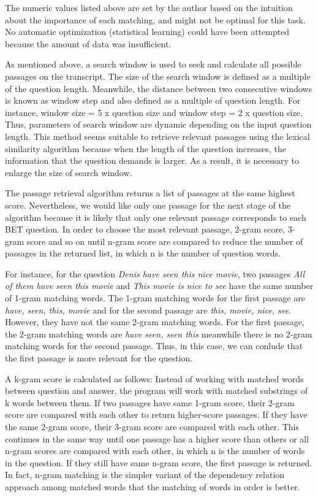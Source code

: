 The numeric values listed above are set by the author based on the intuition about the importance of each matching, and might not be optimal for this task. No automatic optimization (statistical learning) could have been attempted because the amount of data was insufficient.


As mentioned above, a search window is used to seek and calculate all possible passages on the transcript. The size of the search window is defined as a multiple of the question length. Meanwhile, the distance between two consecutive windows is known as window step and also defined as a multiple of question length. For instance, window size = 5 x question size and window step = 2 x question size. Thus, parameters of search window are dynamic depending on the input question length. This method seems suitable to retrieve relevant passages using the lexical similarity algorithm because when the length of the question increases, the information that the question demands is larger. As a result, it is necessary to enlarge the size of search window.

The passage retrieval algorithm returns a list of passages at the same highest score. Nevertheless, we would like only one passage for the next stage of the algorithm because it is likely that only one relevant passage corresponds to each BET question. In order to choose the most relevant passage, 2-gram score, 3-gram score and so on until n-gram score are compared to reduce the number of passages in the returned list, in which n is the number of question words. 

For instance, for the question \textit{Denis have seen this nice movie}, two passages \textit{All of them have seen this movie } and \textit{This movie is nice to see} have the same number of 1-gram matching words. The 1-gram matching words for the first passage are \textit{have, seen, this, movie} and for the second passage are \textit{this, movie, nice, see}. However, they have not the same 2-gram matching words. For the first passage, the 2-gram matching words are \textit{have seen, seen this} meanwhile there is no 2-gram matching words for the second passage. Thus, in this case, we can conlude that the first passage is more relevant for the question. 

A k-gram score is calculated as follows: Instead of working with matched words between question and answer, the program will work with matched substrings of k words between them. If two passages have same 1-gram score, their 2-gram score are compared with each other to return higher-score passages. If they have the same 2-gram score, their 3-gram score are compared with each other. This continues in the same way until one passage has a higher score than others or all n-gram scores are compared with each other, in which n is the number of words in the question. If they still have same n-gram score, the first passage is returned. In fact, n-gram matching is the simpler variant of the dependency relation approach among matched words that the matching of words in order is better.



